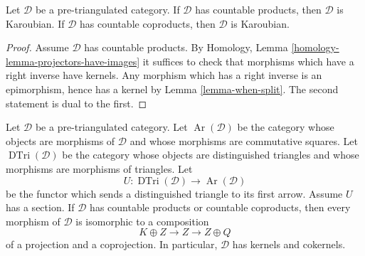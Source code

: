 \begin{lemma}
\label{lemma-projectors-have-images-triangulated}
Let $\mathcal{D}$ be a pre-triangulated category.
If $\mathcal{D}$ has countable products, then $\mathcal{D}$
is Karoubian.
If $\mathcal{D}$ has countable coproducts, then $\mathcal{D}$
is Karoubian.
\end{lemma}

\begin{proof}
Assume $\mathcal{D}$ has countable products. By
Homology, Lemma \ref{homology-lemma-projectors-have-images}
it suffices to check that morphisms which have a right inverse have kernels.
Any morphism which has a right inverse is an epimorphism, hence
has a kernel by
Lemma \ref{lemma-when-split}.
The second statement is dual to the first.
\end{proof}

\begin{lemma}
\label{lemma-functorial-triangles-decomposable}
Let $\mathcal{D}$ be a pre-triangulated category. Let
$\operatorname{Ar}(\mathcal{D})$ be the category whose objects are morphisms
of $\mathcal{D}$ and whose morphisms are commutative squares. Let
$\operatorname{DTri}(\mathcal{D})$ be the category whose objects are
distinguished triangles and whose morphisms are morphisms of triangles. Let
$$
U : \operatorname{DTri}(\mathcal{D}) \longrightarrow
\operatorname{Ar}(\mathcal{D})
$$
be the functor which sends a distinguished triangle to its first arrow.
Assume $U$ has a section. If $\mathcal{D}$ has countable products or countable
coproducts, then every morphism of $\mathcal{D}$ is isomorphic to a composition
$$
K \oplus Z \longrightarrow Z \longrightarrow Z \oplus Q
$$
of a projection and a coprojection. In particular, $\mathcal{D}$ has kernels
and cokernels.
\end{lemma}

